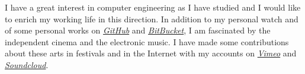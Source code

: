 
I have a great interest in computer engineering as I have studied and I would like to enrich my working life in this direction. In addition to my personal watch and of some personal works on \href{https://github.com/vlnk}{\textit{GitHub}} and \href{https://bitbucket.org/vlnk}{\textit{BitBucket}}, I am fascinated by the independent cinema and the electronic music. I have made some contributions about these arts in festivals and in the Internet with my accounts on \href{https://vimeo.com/user3599832}{\textit{Vimeo}} and \href{https://soundcloud.com/vlnk}{\textit{Soundcloud}}.
